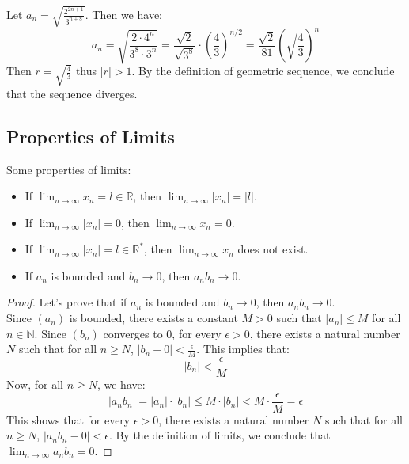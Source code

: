 \begin{eg}
    Let $a_n = \sqrt{\frac{2^{2n + 1}}{3^{n + 8}}}$. Then we have:
    \[ a_n = \sqrt{\frac{2 \cdot 4^n}{3^8 \cdot 3^n}} = \frac{\sqrt{2}}{\sqrt{3^8}} \cdot \left(\frac{4}{3}\right)^{n/2} = \frac{\sqrt{2}}{81} \left(\sqrt{\frac{4}{3}}\right)^n \]
    Then $r = \sqrt{\frac{4}{3}}$ thus $|r| > 1$. By the definition of geometric sequence, we conclude that the sequence diverges.
\end{eg}

\subsection{Properties of Limits}
Some properties of limits:
\begin{itemize}[itemsep=1pt,label=$\circ$]
    \item If $\lim_{n \to \infty} x_n = l \in \mathbb{R}$, then $\lim_{n \to \infty} |x_n| = |l|$.
    \item If $\lim_{n \to \infty} |x_n| = 0$, then $\lim_{n \to \infty} x_n = 0$.
    \item If $\lim_{n \to \infty} |x_n| = l \in \mathbb{R}^*$, then $\lim_{n \to \infty} x_n$ does not exist.
    \item If $a_n$ is bounded and $b_n \to 0$, then $a_n b_n \to 0$.
\end{itemize}
\begin{proof}
    Let's prove that if $a_n$ is bounded and $b_n \to 0$, then $a_n b_n \to 0$. \\
    Since \( (a_n) \) is bounded, there exists a constant \( M > 0 \) such that \( |a_n| \leq M \) for all \( n \in \mathbb{N} \). Since \( (b_n) \) converges to 0, for every \( \epsilon > 0 \), there exists a natural number \( N \) such that for all \( n \geq N \), \( |b_n - 0| < \frac{\epsilon}{M} \). This implies that:
    \[ |b_n| < \frac{\epsilon}{M} \]
    Now, for all \( n \geq N \), we have:
    \[ |a_n b_n| = |a_n| \cdot |b_n| \leq M \cdot |b_n| < M \cdot \frac{\epsilon}{M} = \epsilon \]
    This shows that for every \( \epsilon > 0 \), there exists a natural number \( N \) such that for all \( n \geq N \), \( |a_n b_n - 0| < \epsilon \). By the definition of limits, we conclude that \( \lim_{n \to \infty} a_n b_n = 0 \).
\end{proof}

